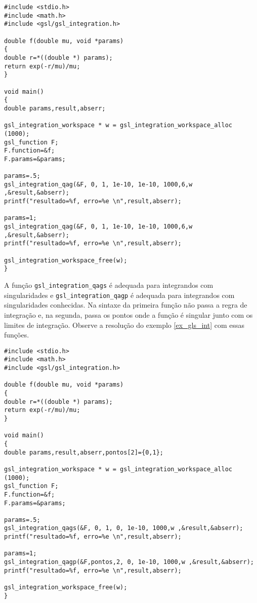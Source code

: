 \begin{verbatim}
#include <stdio.h>
#include <math.h>
#include <gsl/gsl_integration.h>

double f(double mu, void *params)
{
double r=*((double *) params);
return exp(-r/mu)/mu;
}

void main()
{
double params,result,abserr;

gsl_integration_workspace * w = gsl_integration_workspace_alloc (1000);
gsl_function F;
F.function=&f;
F.params=&params;

params=.5;
gsl_integration_qag(&F, 0, 1, 1e-10, 1e-10, 1000,6,w ,&result,&abserr);
printf("resultado=%f, erro=%e \n",result,abserr);

params=1;
gsl_integration_qag(&F, 0, 1, 1e-10, 1e-10, 1000,6,w ,&result,&abserr);
printf("resultado=%f, erro=%e \n",result,abserr);

gsl_integration_workspace_free(w);
}
\end{verbatim}

A função \verb|gsl_integration_qags| é adequada para integrandos com singularidades e \verb|gsl_integration_qagp| é adequada para integrandos com singularidades conhecidas. Na sintaxe da primeira função não passa a regra de integração e, na segunda, passa os pontos onde a função é singular junto com os limites de integração. Observe a resolução do exemplo \ref{ex_gls_int} com essas funções.
\begin{verbatim}
#include <stdio.h>
#include <math.h>
#include <gsl/gsl_integration.h>

double f(double mu, void *params)
{
double r=*((double *) params);
return exp(-r/mu)/mu;
}

void main()
{
double params,result,abserr,pontos[2]={0,1};

gsl_integration_workspace * w = gsl_integration_workspace_alloc (1000);
gsl_function F;
F.function=&f;
F.params=&params;

params=.5;
gsl_integration_qags(&F, 0, 1, 0, 1e-10, 1000,w ,&result,&abserr);
printf("resultado=%f, erro=%e \n",result,abserr);

params=1;
gsl_integration_qagp(&F,pontos,2, 0, 1e-10, 1000,w ,&result,&abserr);
printf("resultado=%f, erro=%e \n",result,abserr);

gsl_integration_workspace_free(w);
}
\end{verbatim}


